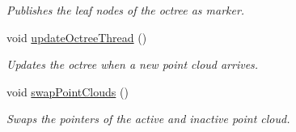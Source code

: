 \begin{DoxyCompactItemize}
\begin{DoxyCompactList}\small\item\em Publishes the leaf nodes of the octree as marker. \end{DoxyCompactList}\item 
\hypertarget{classCollisionScene_aa33eb3f701cfd4d750cfedec58bc9729}{void \hyperlink{classCollisionScene_aa33eb3f701cfd4d750cfedec58bc9729}{update\-Octree\-Thread} ()}\label{classCollisionScene_aa33eb3f701cfd4d750cfedec58bc9729}

\begin{DoxyCompactList}\small\item\em Updates the octree when a new point cloud arrives. \end{DoxyCompactList}\item 
\hypertarget{classCollisionScene_ae6d94b627968a2508cd2ac43a83cf1bf}{void \hyperlink{classCollisionScene_ae6d94b627968a2508cd2ac43a83cf1bf}{swap\-Point\-Clouds} ()}\label{classCollisionScene_ae6d94b627968a2508cd2ac43a83cf1bf}

\begin{DoxyCompactList}\small\item\em Swaps the pointers of the active and inactive point cloud. \end{DoxyCompactList}\end{DoxyCompactItemize}
